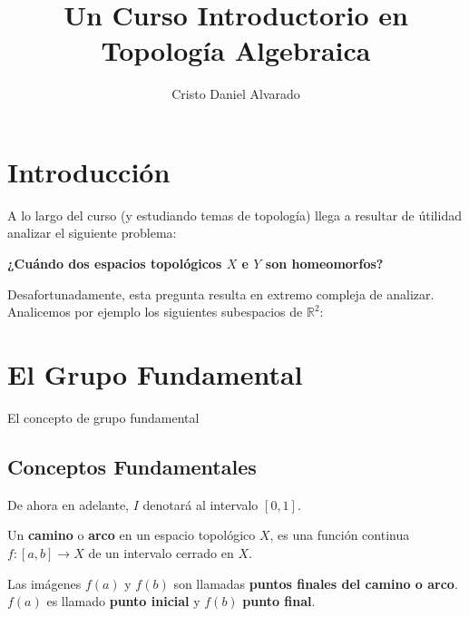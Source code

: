 \documentclass[12pt]{report}
\theoremstyle{largebreak}
\newcommand\cf[3]{\ensuremath{#1:#2\rightarrow#3}}
\begin{document}
    \setlength{\parskip}{5pt} %
    \setlength{\parindent}{12pt} %
    \title{Un Curso Introductorio en Topología Algebraica}
    \author{Cristo Daniel Alvarado}
    \maketitle

    \tableofcontents %

    
    \chapter{Introducción}
    
    A lo largo del curso (y estudiando temas de topología) llega a resultar de útilidad analizar el siguiente problema:

    \begin{center}
        \textbf{¿Cuándo dos espacios topológicos $X$ e $Y$ son homeomorfos?}
    \end{center}

    Desafortunadamente, esta pregunta resulta en extremo compleja de analizar. Analicemos por ejemplo los siguientes subespacios de $\mathbb{R}^2$:


    \chapter{El Grupo Fundamental}

    El concepto de grupo fundamental 

    \section{Conceptos Fundamentales}

    De ahora en adelante, $I$ denotará al intervalo $[0,1]$.

    \begin{mydef}
        Un \textbf{camino} o \textbf{arco} en un espacio topológico $X$, es una función continua $\cf{f}{[a,b]}{X}$ de un intervalo cerrado en $X$.

        Las imágenes $f(a)$ y $f(b)$ son llamadas \textbf{puntos finales del camino o arco}. $f(a)$ es llamado \textbf{punto inicial} y $f(b)$ \textbf{punto final}.
    \end{mydef}
\end{document}
